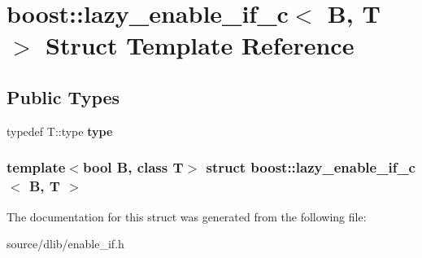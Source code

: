 \hypertarget{structboost_1_1lazy__enable__if__c}{
\section{boost::lazy\_\-enable\_\-if\_\-c$<$ B, T $>$ Struct Template Reference}
\label{structboost_1_1lazy__enable__if__c}
}
\subsection*{Public Types}
\begin{DoxyCompactItemize}
\item 
\hypertarget{structboost_1_1lazy__enable__if__c_af11bb72718b0a05956dea253d0517d7a}{
typedef T::type {\bfseries type}}
\label{structboost_1_1lazy__enable__if__c_af11bb72718b0a05956dea253d0517d7a}

\end{DoxyCompactItemize}
\subsubsection*{template$<$bool B, class T$>$ struct boost::lazy\_\-enable\_\-if\_\-c$<$ B, T $>$}



The documentation for this struct was generated from the following file:\begin{DoxyCompactItemize}
\item 
source/dlib/enable\_\-if.h\end{DoxyCompactItemize}
